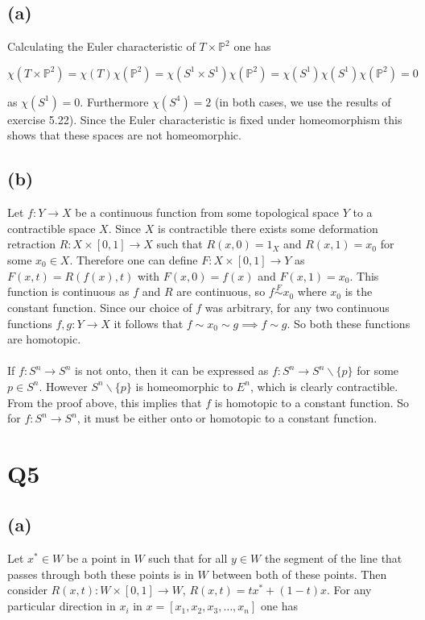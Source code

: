 \documentclass{article}
\begin{document}
\subsection*{(a)}
Calculating the Euler characteristic of $T \times \mathbb{P}^2$ one has 

\begin{equation*}
    \chi(T \times \mathbb{P}^2) = \chi(T)\chi(\mathbb{P}^2) = \chi(S^1 \times S^1)\chi(\mathbb{P}^2) = \chi(S^1)\chi(S^1)\chi(\mathbb{P}^2) = 0
\end{equation*}

as $\chi(S^1) = 0$. Furthermore $\chi(S^4) = 2$ (in both cases, we use the results of exercise 5.22). 
Since the Euler characteristic is fixed under homeomorphism this shows that these spaces are not 
homeomorphic.

\subsection*{(b)}
Let $f:Y\rightarrow X$ be a continuous function from some topological 
space $Y$ to a contractible space $X$. Since $X$ is contractible there exists some deformation retraction $R:X\times[0,1]\rightarrow X$ such that $R(x,0) = 1_{X}$ 
and $R(x,1) = x_0$ for some $x_0 \in X$. Therefore one can define $F:X\times[0,1] \rightarrow Y$ 
as $F(x,t) = R(f(x),t)$ with $F(x,0) = f(x)$ and $F(x,1) = x_0$. This function is continuous as 
$f$ and $R$ are continuous, so $f \overset{F}{\sim} x_0$ where $x_0$ is the constant function. Since our choice of $f$ was arbitrary, for any two continuous functions 
$f,g:Y\rightarrow X$ it follows that $f \sim x_0 \sim g \implies f \sim g$. So both these 
functions are homotopic.

\paragraph{}
If $f:S^n\rightarrow S^n$ is not onto, then it can be expressed as $f:S^n \rightarrow S^n\backslash \{p\}$ 
for some $p \in S^n$. However $S^n\backslash \{p\}$ is homeomorphic to $E^n$, which is clearly 
contractible. From the proof above, this implies that $f$ is homotopic to a constant 
function. So for $f:S^n\rightarrow S^n$, it must be either onto or homotopic to a constant function.

\section*{Q5}
\subsection*{(a)}
Let $x^* \in W$ be a point in $W$ such that for all $y \in W$ 
the segment of the line that passes through both these points is in $W$ between both of these points. 
Then consider $R(x,t):W\times[0,1]\rightarrow W$, $R(x,t) = tx^* + (1-t)x$. For any 
particular direction in $x_i$ in $x = [x_1,x_2,x_3,\dots,x_n]$ one has 
\end{document}
